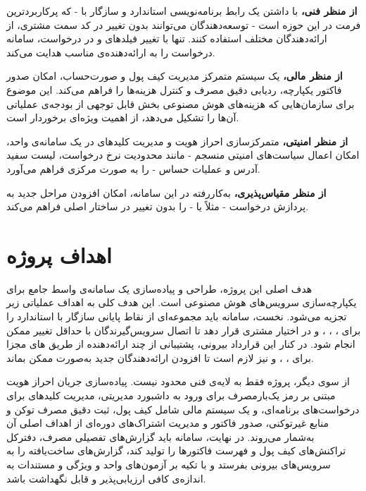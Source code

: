 \textbf{از منظر فنی،} با داشتن یک رابط برنامه‌نویسی استاندارد و سازگار با
 - که پرکاربردترین فرمت در این حوزه است - توسعه‌دهندگان می‌توانند
بدون تغییر در کد سمت مشتری، از ارائه‌دهندگان مختلف استفاده کنند. تنها با
تغییر فیلدهای  و  در درخواست، سامانه
درخواست را به ارائه‌دهنده‌ی مناسب هدایت می‌کند.

\textbf{از منظر مالی،} یک سیستم متمرکز مدیریت کیف پول و صورت‌حساب،
امکان صدور فاکتور یکپارچه، ردیابی دقیق مصرف و کنترل هزینه‌ها را فراهم
می‌کند. این موضوع برای سازمان‌هایی که هزینه‌های هوش مصنوعی بخش قابل
توجهی از بودجه‌ی عملیاتی آن‌ها را تشکیل می‌دهد، از اهمیت ویژه‌ای
برخوردار است.

\textbf{از منظر امنیتی،} متمرکزسازی احراز هویت و مدیریت کلیدهای
 در یک سامانه‌ی واحد، امکان اعمال سیاست‌های امنیتی منسجم - مانند
محدودیت نرخ درخواست، لیست سفید آدرس  و
 عملیات حساس - را به صورت مرکزی فراهم می‌آورد.

\textbf{از منظر مقیاس‌پذیری،} 
به‌کاررفته در این سامانه، امکان افزودن مراحل جدید به پردازش درخواست - مثلاً
 یا  -
را بدون تغییر در ساختار اصلی فراهم می‌کند.

\section{اهداف پروژه}
\label{sec:objectives}

هدف اصلی این پروژه، طراحی و پیاده‌سازی یک سامانه‌ی واسط جامع برای
یکپارچه‌سازی سرویس‌های هوش مصنوعی است. این هدف کلی به اهداف عملیاتی
زیر تجزیه می‌شود. نخست، سامانه باید مجموعه‌ای از نقاط پایانی سازگار با
استاندارد  را برای ،
، ،
 و
 در اختیار مشتری قرار دهد تا
اتصال سرویس‌گیرندگان با حداقل تغییر ممکن انجام شود. در کنار این قرارداد
بیرونی، پشتیبانی از چند ارائه‌دهنده از طریق های
مجزا برای ، ،  و  نیز
لازم است تا افزودن ارائه‌دهندگان جدید به‌صورت
 ممکن بماند.

از سوی دیگر، پروژه فقط به لایه‌ی فنی محدود نیست. پیاده‌سازی جریان احراز
هویت مبتنی بر رمز یک‌بارمصرف برای ورود به داشبورد مدیریتی، مدیریت کلیدهای
 برای درخواست‌های برنامه‌ای، و یک سیستم مالی شامل کیف پول،
ثبت دقیق مصرف توکن و منابع غیرتوکنی، صدور فاکتور و مدیریت اشتراک‌های
دوره‌ای از اهداف اصلی آن به‌شمار می‌روند. در نهایت، سامانه باید گزارش‌های
تفصیلی مصرف، دفترکل تراکنش‌های کیف پول و فهرست فاکتورها را تولید کند،
گزارش‌های ساخت‌یافته را به سرویس‌های بیرونی بفرستد و با تکیه بر آزمون‌های
واحد و ویژگی و مستندات  به اندازه‌ی کافی ارزیابی‌پذیر و
قابل نگهداشت باشد.

